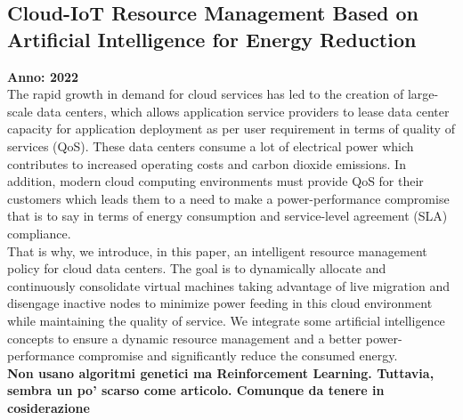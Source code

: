 \subsection{Cloud-IoT Resource Management Based on Artificial Intelligence for Energy Reduction}
\textbf{Anno: 2022}~\cite{daoud2022cloud}\\
The rapid growth in demand for cloud services has led to the creation of large-scale data centers, which allows application service providers to lease data center 
capacity for application deployment as per user requirement in terms of quality of services (QoS). These data centers consume a lot of electrical power which 
contributes to increased operating costs and carbon dioxide emissions. In addition, modern cloud computing environments must provide QoS for their customers which 
leads them to a need to make a power-performance compromise that is to say in terms of energy consumption and service-level agreement (SLA) compliance. \\
That is why, we introduce, in this paper, an intelligent resource management policy for cloud data centers. 
The goal is to dynamically allocate and continuously consolidate virtual machines taking advantage of live migration and disengage inactive nodes to minimize 
power feeding in this cloud environment while maintaining the quality of service. 
We integrate some artificial intelligence concepts to ensure a dynamic resource management and a better power-performance compromise and significantly reduce the consumed energy.\\

\textbf{Non usano algoritmi genetici ma Reinforcement Learning. Tuttavia, sembra un po' scarso come articolo. Comunque da tenere in cosiderazione}


